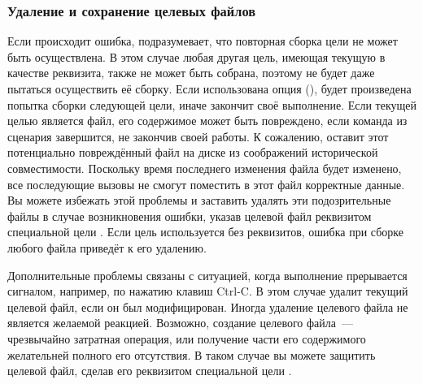 \subsubsection*{Удаление и сохранение целевых файлов}
Если происходит ошибка, \GNUmake{} подразумевает, что повторная сборка
цели не может быть осуществлена. В этом случае любая другая цель,
имеющая текущую в качестве реквизита, также не может быть собрана,
поэтому \GNUmake{} не будет даже пытаться осуществить её сборку. Если
использована опция  (), будет
произведена попытка сборки следующей цели, иначе \GNUmake{} закончит
своё выполнение. Если текущей целью является файл, его содержимое
может быть повреждено, если команда из сценария завершится, не
закончив своей работы. К сожалению, \GNUmake{} оставит этот
потенциально повреждённый файл на диске из соображений исторической
совместимости. Поскольку время последнего изменения файла будет
изменено, все последующие вызовы \GNUmake{} не смогут поместить в этот
файл корректные данные. Вы можете избежать этой проблемы и заставить
\GNUmake{} удалять эти подозрительные файлы в случае возникновения
ошибки, указав целевой файл реквизитом специальной цели
. Если цель 
используется без реквизитов, ошибка при сборке любого файла приведёт к
его удалению.

Дополнительные проблемы связаны с ситуацией, когда выполнение
\GNUmake{} прерывается сигналом, например, по нажатию клавиш Ctrl-C. В
этом случае \GNUmake{} удалит текущий целевой файл, если он был
модифицирован. Иногда удаление целевого файла не является желаемой
реакцией. Возможно, создание целевого файла~--- чрезвычайно затратная
операция, или получение части его содержимого желательней полного
его отсутствия. В таком случае вы можете защитить целевой файл, сделав
его реквизитом специальной цели .
